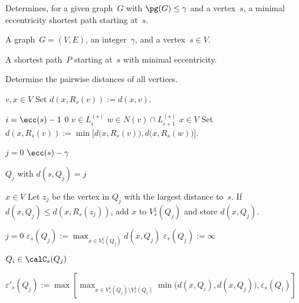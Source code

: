\begin{algorithm}
    [htb!]
    \caption
    {
        Determines, for a given graph~$G$ with $\pg(G) \leq \gamma$ and a vertex~$s$, a minimal eccentricity shortest path starting at~$s$.
    }
    \label{algo:valMESP}

\KwIn
{
    A graph~$G = (V, E)$, an integer~$\gamma$, and a vertex~$s \in V$.
}

\KwOut
{
    A shortest path~$P$ starting at~$s$ with minimal eccentricity.
}

Determine the pairwise distances of all vertices.
\label{line:pairwDistance}

\ForEach
{
    $v, x \in V$
}
{
    Set $d(x, R_s(v)) := d(x, v)$.
    \label{line:defaultR}
}

\For
{
    $i = \ecc(s) - 1$ \KwDownTo $0$
    \label{line:compRsStart}
}
{
    \ForEach
    {
        $v \in L_i^{(s)}$
    }
    {
        \ForEach
        {
            $w \in N(v) \cap L_{i+1}^{(s)}$
        }
        {
            \ForEach
            {
                $x \in V$
            }
            {
                Set $d(x, R_s(v)) := \min \Big[ d \big( x, R_s(v) \big), d \big( x, R_s(w) \big) \Big]$.
                \label{line:distRv}
            }
        }
    }
}

\For
{
    $j = 0$ \KwTo $\ecc(s) - \gamma$
    \label{line:QjLoop}
}
{
    \ForEach
    {
        $Q_j$ with $d(s, Q_j) = j$
        \label{line:selectQj}
    }
    {
        \ForEach
        {
            $x \in V$
            \label{line:xQjLoop}
        }
        {
            Let $z_j$ be the vertex in $Q_j$ with the largest distance to~$s$.
            If $d(x, Q_j) \leq d(x, R_s(z_j))$, add $x$ to $V^\downarrow_s(Q_j)$ and store $d(x, Q_j)$.
            \label{line:computeVsOj}
        }

        \If
        {
            $j = 0$
        }
        {
            $\displaystyle \varepsilon_s(Q_j) := \max_{x \in V^\downarrow_s(Q_j)} d(x, Q_j)$
            \label{line:compStartEpsilon}
        }
        \Else
        {
            $\displaystyle \varepsilon_s(Q_j) := \infty$
            \label{line:QjEpsilonInf}
        }

        \ForEach
        {
            $Q_i \in \calC_s(Q_j)$
            \label{line:QiLoop}
        }
        {
            $\displaystyle
                \varepsilon'_s(Q_j) :=
                \max \left[
                    \max_{x \in V^\downarrow_s(Q_j) \setminus V^\downarrow_s(Q_i)} \min \big( d(x, Q_i), d(x, Q_j) \big),
                    \varepsilon_s(Q_i)
                \right]
            $
            \label{line:compEpsilonPrime}

}}}
\end{algorithm}
